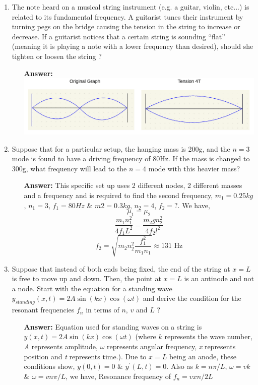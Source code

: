 

\begin{enumerate}
	\item {The note heard on a musical string instrument (e.g. a guitar, violin, etc...) is related to its fundamental frequency. A guitarist tunes their instrument by turning pegs on the bridge causing the tension in the string to increase or decrease. If a guitarist notices that a certain string is sounding “flat” (meaning it is playing a note with a lower frequency than desired), should she tighten or loosen the string ?}
	\begin{enumerate}
		\item[\textbf{Answer: }] {\includegraphics[width=15cm]{Disscussion_1_2302.png}}
	\end{enumerate}
	\item {Suppose that for a particular setup, the hanging mass is 200g, and the $n = 3$ mode is found to have a driving frequency of 80Hz. If the mass is changed to 300g, what frequency will lead to the $n = 4$ mode with this heavier mass?}
	\begin{enumerate}
		\item[\textbf{Answer: }] {This specific set up uses 2 different nodes, 2 different masses and a frequency and is required to find the second frequency, $m_{1} = 0.25kg$, $n_{1} = 3$, $f_{1} = 80Hz$ \& $m{2} = 0.3kg$, $n_{2} = 4$, $f_{2} = ?$. We have, $$\mu_{1} = \mu_{2}$$ $$\frac{m_{1}n_{1}^2}{4f_{1}L^2} = \frac{m_{2}gn_{2}^2}{4f_{2}l^2}$$ $$f_{2} = \sqrt{m_{2}n_{2}^2\frac{f_{1}^2}{m_{1}n_{1}}} \approx 131\text{ Hz}$$}
	\end{enumerate}
	\item {Suppose that instead of both ends being fixed, the end of the string at $x = L$ is free to move up and down. Then, the point at $x = L$ is an antinode and not a node. Start with the equation for a standing wave $y_{standing}(x, t) = 2A\sin(kx)\cos(ωt)$ and derive the condition for the resonant frequencies $f_{n}$ in terms of $n$, $v$ and $L$ ?}
	\begin{enumerate}
		\item[\textbf{Answer: }] {Equation used for standing waves on a string is $y(x, t) = 2A\sin(kx)\cos(\omega t)$ (where $k$ represents the wave number, \textit{A} represents amplitude, $\omega$ represents angular frequency, \textit{x} represents position and \textit{t} represents time.). Due to $x=L$ being an anode, these conditions show, $y(0, t) = 0$ \& $y^{\prime}(L, t) = 0$. Also as $k = n\pi/L$, $\omega = vk$ \& $\omega = vn\pi/L$, we have, Resonance frequency of $f_{n} = vxn/2L$}
	\end{enumerate}
\end{enumerate}

